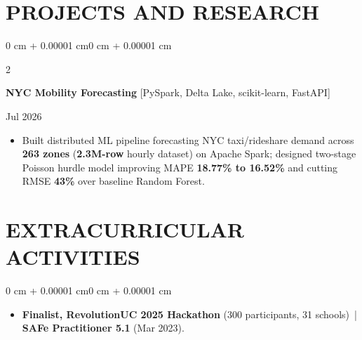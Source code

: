 \documentclass[10pt, letterpaper]{article}
\newenvironment{highlights}{
    \begin{itemize}[
        topsep=0.10 cm,
        parsep=0.06 cm,
        partopsep=0pt,
        itemsep=0.06 cm,
        leftmargin=12pt
    ]
}{
    \end{itemize}
}
\newenvironment{onecolentry}{
    \begin{adjustwidth}{0 cm + 0.00001 cm}{0 cm + 0.00001 cm}
}{
    \end{adjustwidth}
}
\newenvironment{twocolentry}[2][]{
    \onecolentry
    \def\secondColumn{#2}
    \setcolumnwidth{\fill, 4.5 cm}
    \begin{paracol}{2}
}{
    \switchcolumn \raggedleft \secondColumn
    \end{paracol}
    \endonecolentry
}
\begin{document}
\section{PROJECTS AND RESEARCH}
\begin{twocolentry}{Jul 2026}
\textbf{NYC Mobility Forecasting} [PySpark, Delta Lake, scikit-learn, FastAPI]
\end{twocolentry}
\begin{highlights}
  \item Built distributed ML pipeline forecasting NYC taxi/rideshare demand across \textbf{263 zones} (\textbf{2.3M-row} hourly dataset) on Apache Spark; designed two-stage Poisson hurdle model improving MAPE \textbf{18.77\% to 16.52\%} and cutting RMSE \textbf{43\%} over baseline Random Forest.
\end{highlights}

\section{EXTRACURRICULAR ACTIVITIES}
\begin{onecolentry}
\begin{highlights}
  \item \textbf{Finalist, RevolutionUC 2025 Hackathon} (300 participants, 31 schools) \,|\, \textbf{SAFe Practitioner 5.1} (Mar 2023).
\end{highlights}
\end{onecolentry}
\end{document}
